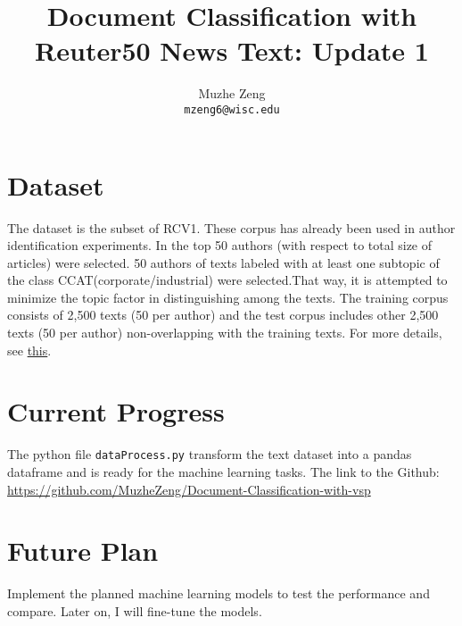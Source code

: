 \documentclass{article}
\title{Document Classification with Reuter50 News Text: Update 1}
\author{
Muzhe Zeng\\
\texttt{mzeng6@wisc.edu} 
}
\begin{document}


\maketitle


\section{Dataset}
The dataset is the subset of RCV1. These corpus has already been used in author identification experiments. In the top 50 authors (with respect to total size of articles) were selected. 50 authors of texts labeled with at least one subtopic of the class CCAT(corporate/industrial) were selected.That way, it is attempted to minimize the topic factor in distinguishing among the texts. The training corpus consists of 2,500 texts (50 per author) and the test corpus includes other 2,500 texts (50 per author) non-overlapping with the training texts. For more details, see \href{https://archive.ics.uci.edu/ml/datasets/Reuter_50_50}{this}. 


\section{Current Progress}

The python file \texttt{dataProcess.py} transform the text dataset into a pandas dataframe and is ready for the machine learning tasks. The link to the Github: \url{https://github.com/MuzheZeng/Document-Classification-with-vsp}

\section{Future Plan}

Implement the planned machine learning models to test the performance and compare. Later on, I will fine-tune the models.
\end{document}
